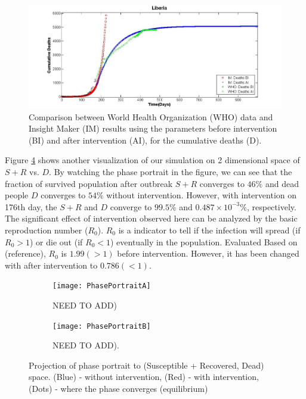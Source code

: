 \begin{figure}[!h]
  \centering
  \includegraphics[width=1\textwidth]{LB_Int2_SD_WHO_IM}
  \caption{ Comparison between World Health Organization (WHO) data and Insight Maker (IM) results using the parameters before intervention (BI) and after intervention (AI), for the cumulative deaths (D).}
\label{fig:LB_IM_WHO2} 
\end{figure}


Figure \ref{fig:PhasePortrait} shows another visualization of our simulation on 2 dimensional space of $S+R$ vs. $D$. By watching the phase portrait in the figure, we can see that the fraction of survived population after outbreak $S+R$ converges to $46\%$ and dead people $D$ converges to $54\%$ without intervention. However, with intervention on 176th day, the $S+R$ and $D$ converge to $99.5\%$ and $0.487 \times10^{-3}\%$, respectively. The significant effect of intervention observed here can be analyzed by the basic reproduction number ($R_0$). $R_0$ is a indicator to tell if the infection will spread (if $R_0>1$) or die out (if $R_0<1$) eventually in the population. Evaluated Based on (reference), $R_0$ is $1.99 (>1)$ before intervention. However, it has been changed with after intervention to $0.786(<1)$.


\begin{figure}[h!]
 \centering 
 \begin{subfigure}[b]{0.38\textwidth}
  \texttt{[image: PhasePortraitA]} \caption{NEED TO ADD)} \label{fig:PhasePortraitA} \end{subfigure}
 \hspace{.1cm}
\begin{subfigure}[b]{0.38\textwidth}
 \texttt{[image: PhasePortraitB]} \caption{NEED TO ADD).} \label{fiig:PhasePortraitB} \end{subfigure} 
\caption{Projection of phase portrait to (Susceptible + Recovered, Dead) space. (Blue) - without intervention, (Red) - with intervention, (Dots) - where the phase converges (equilibrium)}
\label{fig:PhasePortrait} 
\end{figure}





